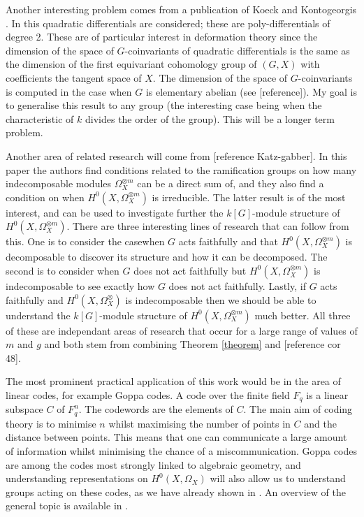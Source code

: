\documentclass[draft, 11pt, notitlepage]{article} %
\theoremstyle{plain}
\theoremstyle{remark}
\begin{document}
Another interesting problem comes from a publication of Koeck and Kontogeorgis \cite{quaddiffequi}. In this quadratic differentials are considered; these are poly-differentials of degree 2. These are of particular interest in deformation theory since the dimension of the space of $G$-coinvariants of quadratic differentials is the same as the dimension of the first equivariant cohomology group of $(G,X)$ with coefficients the tangent space of $X$.
The dimension of the space of $G$-coinvariants is computed in the case when $G$ is elementary abelian (see [reference]).
 My goal is to generalise this result to any group (the interesting case being when the characteristic of $k$ divides the order of the group).
This will be a longer term problem.


Another area of related research will come from [reference Katz-gabber].
In this paper the authors find conditions related to the ramification groups on how many indecomposable modules $\Omega_X^{\otimes m}$ can be a direct sum of, and they also find a condition on when $H^0(X,\Omega_X^{\otimes m})$ is irreducible.
The latter result is of the most interest, and can be used to investigate further the $k[G]$-module structure of $H^0(X,\Omega_X^{\otimes m})$. 
There are three interesting lines of research that can follow from this.
One is to consider the casewhen $G$ acts faithfully and that $H^0(X,\Omega_X^{\otimes m})$ is decomposable to discover its structure and how it can be decomposed.
The second is to consider when $G$ does not act faithfully but $H^0(X,\Omega_X^{\otimes m})$ is indecomposable to see exactly how $G$ does not act faithfully.
Lastly, if $G$ acts faithfully and $H^0(X,\Omega_X^{\otimes})$ is indecomposable then we should be able to understand the $k[G]$-module structure of $H^0(X,\Omega_X^{\otimes m})$ much better.
All three of these are independant areas of research that occur for a large range of values of $m$ and $g$ and both stem from combining Theorem \ref{theorem} and [reference cor 48].




The most prominent practical application of this work would be in the area of linear codes, for example Goppa codes.
A code over the finite field $F_q$ is a linear subspace $C$ of $F_q^n$.
The codewords are the elements of $C$.
The main aim of coding theory is to minimise $n$ whilst maximising the number of points in $C$ and the distance between points.
This means that one can communicate a large amount of information whilst minimising the chance of a miscommunication.
Goppa codes are among the codes most strongly linked to algebraic geometry, and understanding representations on $H^0(X,\Omega_X)$ will also allow us to understand groups acting on these codes, as we have already shown in \cite[\S 7]{faithfulaction}.
An overview of the general topic is available in \cite{stichtenoth}.
\end{document}
